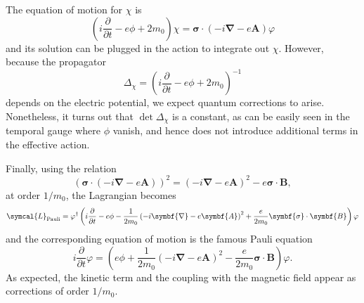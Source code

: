 The equation of motion for $\chi$ is
\begin{equation}
  \left( i \frac{\partial}{\partial t} - e \phi + 2 m_0 \right) \chi = \symbf{\sigma} \cdot \left(- i \symbf{\nabla} - e \symbf{A} \right) \varphi 
\end{equation}
and its solution can be plugged in the action to integrate out $\chi$. However, because the propagator 
\begin{equation}
  \Delta_\chi = \left( i \frac{\partial}{\partial t} - e \phi + 2 m_0 \right)^{-1} 
\end{equation}
depends on the electric potential, we expect quantum corrections to arise. Nonetheless, it turns out that $\det \Delta_\chi$ is a constant, as can be easily seen in the temporal gauge where $\phi$ vanish, and hence does not introduce additional terms in the effective action.

Finally, using the relation
\begin{equation}
  \left( \symbf{\sigma} \cdot \left( -i \symbf{\nabla} - e \symbf{A} \right) \right)^2 = \left(-i \symbf{\nabla} - e \symbf{A} \right)^2 - e \symbf{\sigma} \cdot \symbf{B} ,
\end{equation}
at order $1/m_0$, the Lagrangian becomes
\begin{equation}
  \symcal{L}_\text{Pauli} = \varphi^\dagger \left(i \frac{\partial}{\partial t} - e \phi - \frac{1}{2 m_0} \left( - i \symbf{\nabla} - e \symbf{A} \right)^2  + \frac{e}{2 m_0} \symbf{\sigma} \cdot \symbf{B} \right) \varphi
\end{equation}
and the corresponding equation of motion is the famous Pauli equation
\begin{equation}
  i \frac{\partial}{\partial t} \varphi = \left( e \phi + \frac{1}{2 m_0} \left( - i \symbf{\nabla} - e \symbf{A} \right)^2 - \frac{e}{2 m_0} \symbf{\sigma} \cdot \symbf{B} \right) \varphi .
\end{equation}
As expected, the kinetic term and the coupling with the magnetic field appear as corrections of order $1/m_0$.

